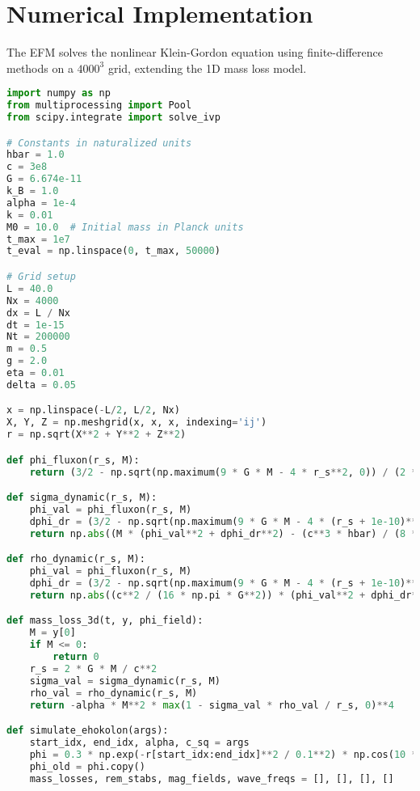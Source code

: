 \documentclass[11pt]{article}
\begin{document}
\section{Numerical Implementation}
The EFM solves the nonlinear Klein-Gordon equation using finite-difference methods on a \(4000^3\) grid, extending the 1D mass loss model.

\begin{lstlisting}[language=Python, caption={Fluxonic Black Hole Evaporation Simulation}, label=lst:simulation]
import numpy as np
from multiprocessing import Pool
from scipy.integrate import solve_ivp

# Constants in naturalized units
hbar = 1.0
c = 3e8
G = 6.674e-11
k_B = 1.0
alpha = 1e-4
k = 0.01
M0 = 10.0  # Initial mass in Planck units
t_max = 1e7
t_eval = np.linspace(0, t_max, 50000)

# Grid setup
L = 40.0
Nx = 4000
dx = L / Nx
dt = 1e-15
Nt = 200000
m = 0.5
g = 2.0
eta = 0.01
delta = 0.05

x = np.linspace(-L/2, L/2, Nx)
X, Y, Z = np.meshgrid(x, x, x, indexing='ij')
r = np.sqrt(X**2 + Y**2 + Z**2)

def phi_fluxon(r_s, M):
    return (3/2 - np.sqrt(np.maximum(9 * G * M - 4 * r_s**2, 0)) / (2 * np.sqrt(G) * np.sqrt(M))) * r_s

def sigma_dynamic(r_s, M):
    phi_val = phi_fluxon(r_s, M)
    dphi_dr = (3/2 - np.sqrt(np.maximum(9 * G * M - 4 * (r_s + 1e-10)**2, 0)) / (2 * np.sqrt(G) * np.sqrt(M))) * (r_s + 1e-10) - phi_val
    return np.abs((M * (phi_val**2 + dphi_dr**2) - (c**3 * hbar) / (8 * np.pi * G)) / (8 * np.pi * G * M))

def rho_dynamic(r_s, M):
    phi_val = phi_fluxon(r_s, M)
    dphi_dr = (3/2 - np.sqrt(np.maximum(9 * G * M - 4 * (r_s + 1e-10)**2, 0)) / (2 * np.sqrt(G) * np.sqrt(M))) * (r_s + 1e-10) - phi_val
    return np.abs((c**2 / (16 * np.pi * G**2)) * (phi_val**2 + dphi_dr**2))

def mass_loss_3d(t, y, phi_field):
    M = y[0]
    if M <= 0:
        return 0
    r_s = 2 * G * M / c**2
    sigma_val = sigma_dynamic(r_s, M)
    rho_val = rho_dynamic(r_s, M)
    return -alpha * M**2 * max(1 - sigma_val * rho_val / r_s, 0)**4

def simulate_ehokolon(args):
    start_idx, end_idx, alpha, c_sq = args
    phi = 0.3 * np.exp(-r[start_idx:end_idx]**2 / 0.1**2) * np.cos(10 * X[start_idx:end_idx]) + 0.1 * np.random.rand(Nx//64, Nx, Nx)
    phi_old = phi.copy()
    mass_losses, rem_stabs, mag_fields, wave_freqs = [], [], [], []
    

\end{lstlisting}
\end{document}

